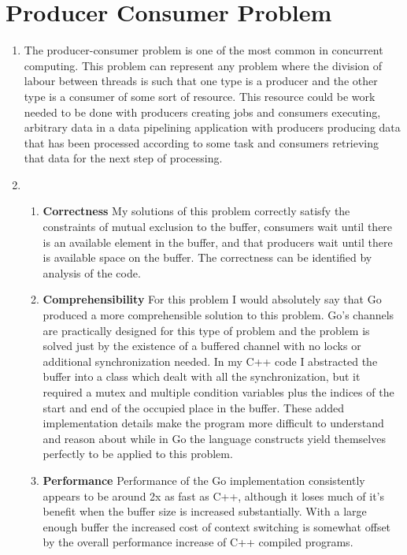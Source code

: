 \documentclass[11pt]{article}
\begin{document}
\section{Producer Consumer Problem}
\begin{enumerate}
	\item The producer-consumer problem is one of the most common in concurrent computing. This problem can represent any problem where the division of labour between threads is such that one type is a producer and the other type is a consumer of some sort of resource. This resource could be work needed to be done with producers creating jobs and consumers executing, arbitrary data in a data pipelining application with producers producing data that has been processed according to some task and consumers retrieving that data for the next step of processing. 

	\item
	\begin{enumerate}
	\item \textbf{Correctness}\linebreak
	My solutions of this problem correctly satisfy the constraints of mutual exclusion to the buffer, consumers wait until there is an available element in the buffer, and that producers wait until there is available space on the buffer. The correctness can be identified by analysis of the code.	
	\item \textbf{Comprehensibility}\linebreak
	For this problem I would absolutely say that Go produced a more comprehensible solution to this problem. Go's channels are practically designed for this type of problem and the problem is solved just by the existence of a buffered channel with no locks or additional synchronization needed. In my C++ code I abstracted the buffer into a class which dealt with all the synchronization, but it required a mutex and multiple condition variables plus the indices of the start and end of the occupied place in the buffer. These added implementation details make the program more difficult to understand and reason about while in Go the language constructs yield themselves perfectly to be applied to this problem.
	\item \textbf{Performance}\linebreak
	Performance of the Go implementation consistently appears to be around 2x as fast as C++, although it loses much of it's benefit when the buffer size is increased substantially. With a large enough buffer the increased cost of context switching is somewhat offset by the overall performance increase of C++ compiled programs.
	
	\end{enumerate}	
\end{enumerate}
\end{document}
